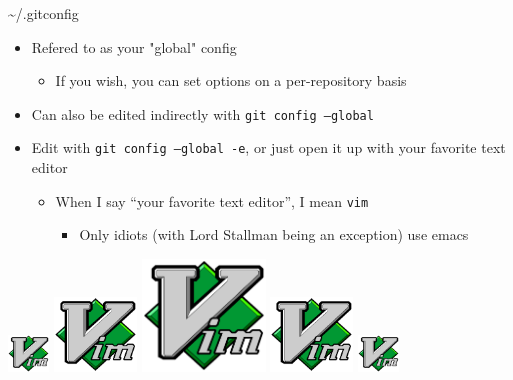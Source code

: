 \documentclass[aspectratio=43]{beamer}
\begin{document}
\begin{frame}{\textasciitilde/.gitconfig}
    \begin{itemize}
    \item Refered to as your "global" config
        \begin{itemize}
        \item If you wish, you can set options on a per-repository basis
        \end{itemize}
    \item Can also be edited indirectly with \texttt{git config --global}
    \item Edit with \texttt{git config --global -e}, or just open it up with
        your favorite text editor
        \begin{itemize}
        \item When I say ``your favorite text editor'', I mean \texttt{vim}
            \begin{itemize}
            \item Only idiots (with Lord Stallman being an exception) use emacs
            \end{itemize}
        \end{itemize}
    \end{itemize}
    \begin{center}
        \includegraphics[height=1cm]{resources/vim_logo.pdf}
        \includegraphics[height=2cm]{resources/vim_logo.pdf}
        \includegraphics[height=3cm]{resources/vim_logo.pdf}
        \includegraphics[height=2cm]{resources/vim_logo.pdf}
        \includegraphics[height=1cm]{resources/vim_logo.pdf}
    \end{center}
\end{frame}
\end{document}
